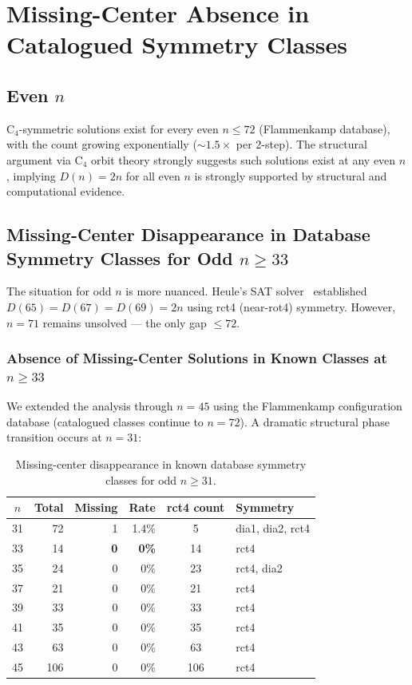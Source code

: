 \documentclass[11pt,a4paper]{article}
\theoremstyle{plain}
\theoremstyle{definition}
\begin{document}
\section{Missing-Center Absence in Catalogued Symmetry Classes}
\label{sec:extinction}

\subsection{Even $n$}

C$_4$-symmetric solutions exist for every even $n\le 72$ (Flammenkamp database), with the count growing exponentially ($\sim1.5\times$ per 2-step). The structural argument via C$_4$ orbit theory strongly suggests such solutions exist at any even $n$, implying $D(n)=2n$ for all even $n$ is strongly supported by structural and computational evidence.

\subsection{Missing-Center Disappearance in Database Symmetry Classes for Odd $n\ge 33$}

The situation for odd $n$ is more nuanced. Heule's SAT solver~\cite{heule2026} established $D(65)=D(67)=D(69)=2n$ using rct4 (near-rot4) symmetry. However, $n=71$ remains unsolved --- the only gap $\le 72$.

\subsubsection{Absence of Missing-Center Solutions in Known Classes at $n\ge 33$}

We extended the analysis through $n=45$ using the Flammenkamp configuration database (catalogued classes continue to $n=72$). A dramatic structural phase transition occurs at $n=31$:

\begin{table}[H]
\centering
\caption{Missing-center disappearance in known database symmetry classes for odd $n\ge 31$.}
\label{tab:extinct}
\begin{tabular}{crrrcl}
\toprule
$n$ & Total & Missing & Rate & rct4 count & Symmetry \\
\midrule
31 & 72 & 1 & 1.4\% & 5 & dia1, dia2, rct4 \\
33 & 14 & \textbf{0} & \textbf{0\%} & 14 & rct4 \\
35 & 24 & 0 & 0\% & 23 & rct4, dia2 \\
37 & 21 & 0 & 0\% & 21 & rct4 \\
39 & 33 & 0 & 0\% & 33 & rct4 \\
41 & 35 & 0 & 0\% & 35 & rct4 \\
43 & 63 & 0 & 0\% & 63 & rct4 \\
45 & 106 & 0 & 0\% & 106 & rct4 \\
\bottomrule
\end{tabular}
\end{table}
\end{document}
